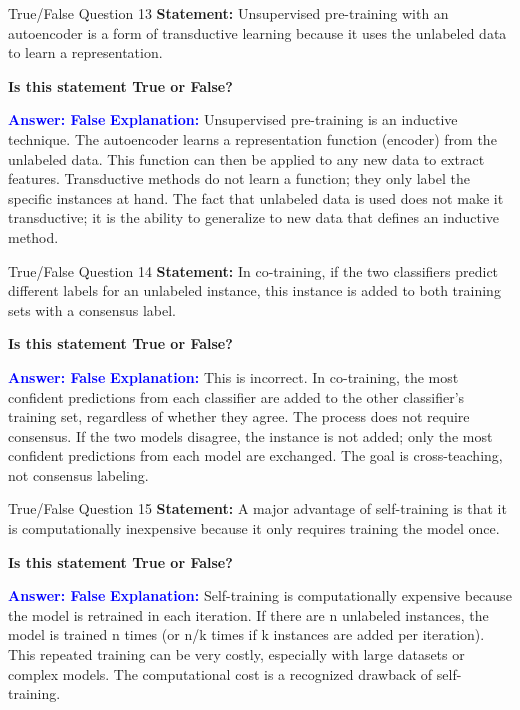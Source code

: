 \documentclass{beamer}
\begin{document}
	\begin{frame}{True/False Question 13}
		\textbf{Statement:} Unsupervised pre-training with an autoencoder is a form of transductive learning because it uses the unlabeled data to learn a representation.
		
		\vspace{0.3cm}
		\textbf{Is this statement True or False?}
		
		\vspace{0.2cm}
		\textcolor{blue}{\textbf{Answer: False}}
		\vspace{0.2cm}
		\textcolor{blue}{\textbf{Explanation:}} Unsupervised pre-training is an inductive technique. The autoencoder learns a representation function (encoder) from the unlabeled data. This function can then be applied to any new data to extract features. Transductive methods do not learn a function; they only label the specific instances at hand. The fact that unlabeled data is used does not make it transductive; it is the ability to generalize to new data that defines an inductive method.
	\end{frame}
	
	\begin{frame}{True/False Question 14}
		\textbf{Statement:} In co-training, if the two classifiers predict different labels for an unlabeled instance, this instance is added to both training sets with a consensus label.
		
		\vspace{0.3cm}
		\textbf{Is this statement True or False?}
		
		\vspace{0.2cm}
		\textcolor{blue}{\textbf{Answer: False}}
		\vspace{0.2cm}
		\textcolor{blue}{\textbf{Explanation:}} This is incorrect. In co-training, the most confident predictions from each classifier are added to the other classifier's training set, regardless of whether they agree. The process does not require consensus. If the two models disagree, the instance is not added; only the most confident predictions from each model are exchanged. The goal is cross-teaching, not consensus labeling.
	\end{frame}
	
	\begin{frame}{True/False Question 15}
		\textbf{Statement:} A major advantage of self-training is that it is computationally inexpensive because it only requires training the model once.
		
		\vspace{0.3cm}
		\textbf{Is this statement True or False?}
		
		\vspace{0.2cm}
		\textcolor{blue}{\textbf{Answer: False}}
		\vspace{0.2cm}
		\textcolor{blue}{\textbf{Explanation:}} Self-training is computationally expensive because the model is retrained in each iteration. If there are n unlabeled instances, the model is trained n times (or n/k times if k instances are added per iteration). This repeated training can be very costly, especially with large datasets or complex models. The computational cost is a recognized drawback of self-training.
	\end{frame}
	
\end{document}
